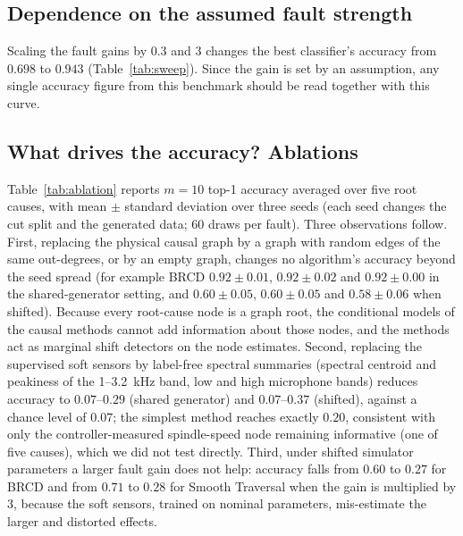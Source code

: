 \documentclass[11pt]{article}
\begin{document}
\subsection{Dependence on the assumed fault strength}
Scaling the fault gains by $0.3$ and $3$ changes the best classifier's accuracy from $0.698$ to $0.943$ (Table~\ref{tab:sweep}).
Since the gain is set by an assumption, any single accuracy figure from this benchmark should be read together with this curve.
\begin{table}[t]\centering\small

\caption{Top-1 accuracy of classifiers on simulated data versus fault gain relative to the calibrated value.}\label{tab:sweep}
\end{table}

\subsection{What drives the accuracy? Ablations}\label{sec:ablation}
Table~\ref{tab:ablation} reports $m{=}10$ top-1 accuracy averaged over five root causes, with mean $\pm$ standard deviation over three seeds (each seed changes the cut split and the generated data; 60 draws per fault).
Three observations follow.
First, replacing the physical causal graph by a graph with random edges of the same out-degrees, or by an empty graph, changes no algorithm's accuracy beyond the seed spread (for example BRCD $0.92\pm0.01$, $0.92\pm0.02$ and $0.92\pm0.00$ in the shared-generator setting, and $0.60\pm0.05$, $0.60\pm0.05$ and $0.58\pm0.06$ when shifted).
Because every root-cause node is a graph root, the conditional models of the causal methods cannot add information about those nodes, and the methods act as marginal shift detectors on the node estimates.
Second, replacing the supervised soft sensors by label-free spectral summaries (spectral centroid and peakiness of the 1--3.2~kHz band, low and high microphone bands) reduces accuracy to $0.07$--$0.29$ (shared generator) and $0.07$--$0.37$ (shifted), against a chance level of $0.07$; the simplest method reaches exactly $0.20$, consistent with only the controller-measured spindle-speed node remaining informative (one of five causes), which we did not test directly.
Third, under shifted simulator parameters a larger fault gain does not help: accuracy falls from $0.60$ to $0.27$ for BRCD and from $0.71$ to $0.28$ for Smooth Traversal when the gain is multiplied by 3, because the soft sensors, trained on nominal parameters, mis-estimate the larger and distorted effects.
\begin{table}[t]\centering\footnotesize

\caption{Ablation of the causal RCA benchmark at $m{=}10$: top-1 accuracy (mean $\pm$ s.d.\ over 3 seeds) for the node construction, the graph and the fault gain; chance $=0.07$.}\label{tab:ablation}
\end{table}
\end{document}
